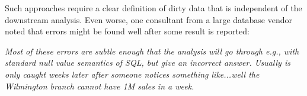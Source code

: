 \vspace{0.5em}

Such approaches require a clear definition of dirty data that is independent of the downstream analysis. Even worse, one consultant from a large database vendor noted that errors might be found well after some result is reported:

\vspace{0.5em}
\emph{Most of these errors are subtle enough that the analysis will go through e.g., with standard null value semantics of SQL, but give an incorrect answer. Usually is only caught weeks later after someone notices something like...well the Wilmington branch cannot have 1M sales in a week.}